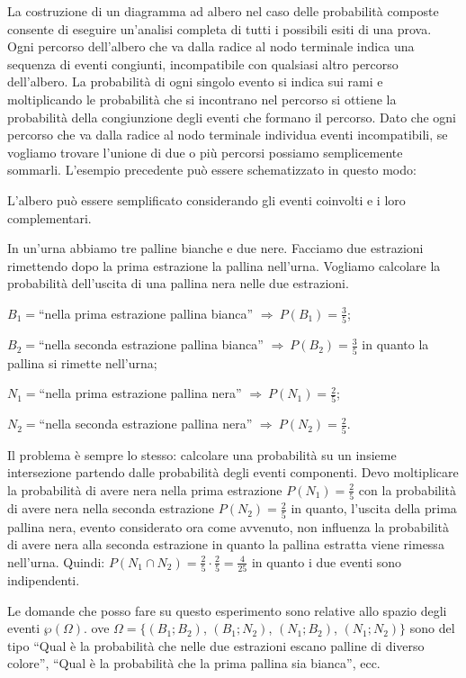 La costruzione di un diagramma ad albero nel caso delle probabilità composte consente di eseguire un'analisi completa di tutti i possibili esiti di una prova. Ogni percorso dell'albero che va dalla radice al nodo terminale indica una sequenza di eventi congiunti, incompatibile con qualsiasi altro percorso dell'albero. La probabilità di ogni singolo evento si indica sui rami e moltiplicando le probabilità che si incontrano nel percorso si ottiene la probabilità della congiunzione degli eventi che formano il percorso. Dato che ogni percorso che va dalla radice al nodo terminale individua eventi incompatibili, se vogliamo trovare l'unione di due o più percorsi possiamo semplicemente sommarli.
L'esempio precedente può essere schematizzato in questo modo:
\begin{center}
 
\end{center}
L'albero può essere semplificato considerando gli eventi coinvolti e i loro complementari.
\pagebreak
\begin{exrig}
\begin{esempio}
In un'urna abbiamo tre palline bianche e due nere. Facciamo due estrazioni rimettendo dopo la prima estrazione la pallina nell'urna. Vogliamo calcolare la probabilità dell'uscita di una pallina nera nelle due estrazioni.
\begin{description*}
\item $B_{1}=$``nella prima estrazione pallina bianca'' $\Rightarrow\: P(B_1)=\frac 3 5$;
\item $B_{2}=$``nella seconda estrazione pallina bianca'' $\Rightarrow\: P(B_2)=\frac 3 5$ in quanto la pallina si rimette nell'urna;
\item $N_{1}=$``nella prima estrazione pallina nera'' $\Rightarrow\: P(N_1)=\frac 2 5$;
\item $N_{2}=$``nella seconda estrazione pallina nera'' $\Rightarrow\: P(N_2)=\frac 2 5$.
\end{description*}
Il problema è sempre lo stesso: calcolare una probabilità su un insieme intersezione partendo dalle probabilità degli eventi componenti. Devo moltiplicare la probabilità di avere nera nella prima estrazione $P(N_1)=\frac 2 5$ con la probabilità di avere nera nella seconda estrazione $P(N_2)=\frac 2 5$ in quanto, l'uscita della prima pallina nera, evento considerato ora come avvenuto, non influenza la probabilità di avere nera alla seconda estrazione in quanto la pallina estratta viene rimessa nell'urna. Quindi: $P(N_1\cap N_2)=\frac 2 5\cdot \frac 2 5=\frac 4{25}$ in quanto i due eventi sono indipendenti.
\begin{center}
 
\end{center}

Le domande che posso fare su questo esperimento sono relative allo spazio degli eventi $\wp(\Omega).$ ove $\Omega =\{(B_1;B_2)$, $(B_1;N_2)$, $(N_1;B_2)$, $(N_1;N_2)\}$ sono del tipo ``Qual è la probabilità che nelle due estrazioni escano palline di diverso colore'', ``Qual è la probabilità che la prima pallina sia bianca'', ecc.
\end{esempio}
\end{exrig}

